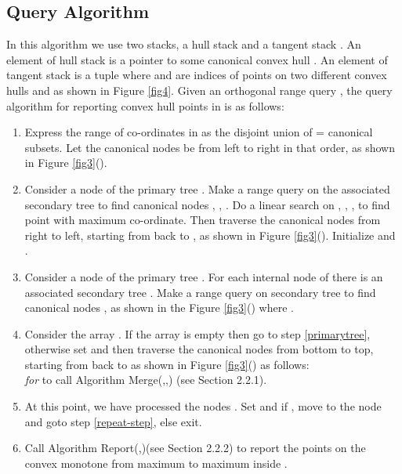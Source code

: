 \documentclass[runningheads,a4paper]{llncs}
\begin{document}
\subsection{Query Algorithm}\label{query-al}In this algorithm we use two stacks, a hull stack  and a tangent stack . An element of hull stack
 is a pointer to some canonical convex hull . An element of tangent stack  is a tuple
 where  and  are indices of points on two different convex hulls  and
 as shown in Figure \ref{fig4}.
Given an orthogonal range query , the query algorithm
for reporting convex hull points in  is as follows:
\begin{enumerate}
\item 
Express the range of  co-ordinates in  as the
disjoint union of  =  canonical subsets. Let the canonical
nodes be  from left to right in that order, as
shown in Figure \ref{fig3}().

\item\label{intial-step} Consider a node  of the primary tree
  . Make a range query  on the associated secondary
  tree  to find canonical nodes , ,
  . Do a linear search on , ,
  ,  to find point  with maximum 
  co-ordinate. Then traverse the canonical nodes from right to left, starting
  from  back to , as shown in Figure \ref{fig3}().
Initialize  and .

\item\label{repeat-step}
Consider a node  of the primary tree
  . For each internal node  of  there is an associated
  secondary tree . Make a range query  on
  secondary tree  to find canonical nodes , as shown in the Figure \ref{fig3}() where
  .

\item\label{secondtree}
Consider the array . If  the array  is empty then go to step \ref{primarytree},
otherwise set  and then traverse the canonical nodes from bottom to top,
starting from  back to  as shown in Figure \ref{fig3}() as follows:\\

{\em for}  to  call Algorithm Merge(,,) (see Section 2.2.1).\\

\item\label{primarytree}
At this point, we have processed the nodes {}. 
Set  and if , move to the node  and
goto step \ref{repeat-step}, else exit.

\item
Call Algorithm Report(,)(see Section 2.2.2) to report the points on the convex monotone from 
maximum  to maximum  inside .\end{enumerate}
\end{document}
